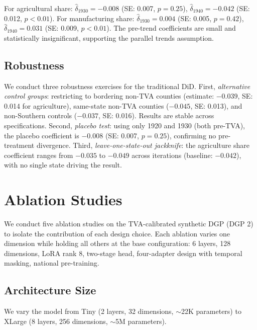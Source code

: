\documentclass[12pt]{article}
\begin{document}
For agricultural share: $\hat{\delta}_{1930} = -0.008$ (SE: 0.007, $p = 0.25$), $\hat{\delta}_{1940} = -0.042$ (SE: 0.012, $p < 0.01$). For manufacturing share: $\hat{\delta}_{1930} = 0.004$ (SE: 0.005, $p = 0.42$), $\hat{\delta}_{1940} = 0.031$ (SE: 0.009, $p < 0.01$). The pre-trend coefficients are small and statistically insignificant, supporting the parallel trends assumption.

\subsection{Robustness}

We conduct three robustness exercises for the traditional DiD. First, \textit{alternative control groups}: restricting to bordering non-TVA counties (estimate: $-0.039$, SE: 0.014 for agriculture), same-state non-TVA counties ($-0.045$, SE: 0.013), and non-Southern controls ($-0.037$, SE: 0.016). Results are stable across specifications. Second, \textit{placebo test}: using only 1920 and 1930 (both pre-TVA), the placebo coefficient is $-0.008$ (SE: 0.007, $p = 0.25$), confirming no pre-treatment divergence. Third, \textit{leave-one-state-out jackknife}: the agriculture share coefficient ranges from $-0.035$ to $-0.049$ across iterations (baseline: $-0.042$), with no single state driving the result.


\section{Ablation Studies}\label{sec:ablations}

We conduct five ablation studies on the TVA-calibrated synthetic DGP (DGP 2) to isolate the contribution of each design choice. Each ablation varies one dimension while holding all others at the base configuration: 6 layers, 128 dimensions, LoRA rank 8, two-stage head, four-adapter design with temporal masking, national pre-training.

\subsection{Architecture Size}

We vary the model from Tiny (2 layers, 32 dimensions, $\sim$22K parameters) to XLarge (8 layers, 256 dimensions, $\sim$5M parameters).
\end{document}
